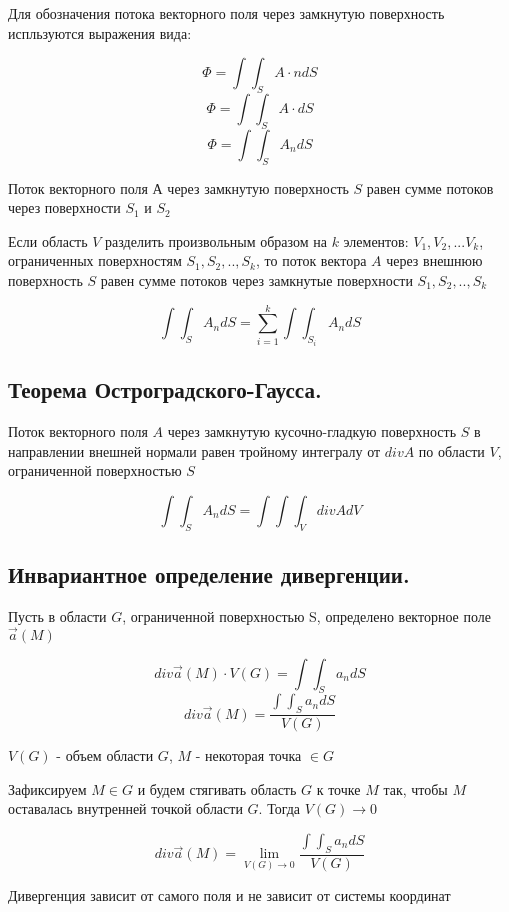 Для обозначения потока векторного поля через замкнутую поверхность испльзуются выражения вида:

$$\Phi = \int\int_S A\cdot ndS$$
$$\Phi = \int\int_S A\cdot dS$$
$$\Phi = \int\int_S A_ndS$$

Поток векторного поля $А$ через замкнутую поверхность $S$ равен сумме потоков через поверхности $S_1$ и $S_2$

Если область $V$ разделить произвольным образом на $k$ элементов: $V_1, V_2,...V_k$, ограниченных поверхностям  $S_1, S_2,.., S_k$, то поток вектора $A$ через внешнюю поверхность $S$ равен сумме потоков через замкнутые поверхности $S_1,S_2,.., S_k$

$$\int\int_S A_ndS = \sum\limits_{i=1}^{k}\int\int_{S_i}A_ndS$$

\subsection{ Теорема Остроградского-Гаусса.}

Поток векторного поля $A$ через замкнутую кусочно-гладкую поверхность $S$ в направлении внешней нормали равен тройному интегралу от $div A$ по области $V$, ограниченной поверхностью $S$

$$\int\int_S A_ndS = \int\int\int_V div A dV$$

\subsection{Инвариантное определение дивергенции.}

Пусть в области $G$, ограниченной поверхностью S, определено векторное поле $\overrightarrow{a}(M)$

$$div \overrightarrow{a}(M)\cdot V(G) = \int\int_S a_ndS$$
$$div\overrightarrow{a}(M) = \frac{\int\int_S a_ndS}{V(G)}$$

$V(G)$ - объем области $G$, $M$ - некоторая точка $\in G$

Зафиксируем $M \in G$ и будем стягивать область $G$ к точке $M$ так, чтобы $M$ оставалась внутренней точкой области $G$. Тогда $V(G) \to 0$

$$div \overrightarrow{a}(M) = \lim\limits_{V(G)\to 0} \frac{\int\int_S a_ndS}{V(G)}$$

Дивергенция зависит от самого поля и не зависит от системы координат